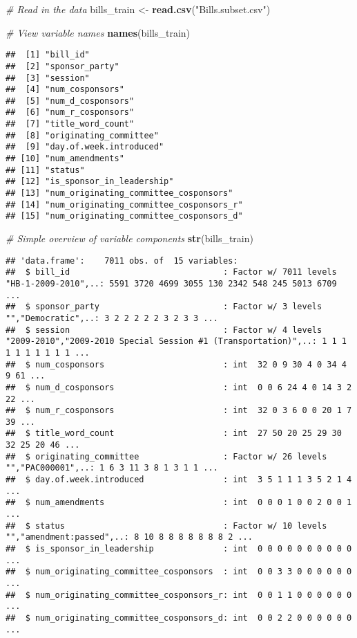 \documentclass[]{article}
\newenvironment{Shaded}{\begin{snugshade}}{\end{snugshade}}
\newcommand{\KeywordTok}[1]{\textcolor[rgb]{0.13,0.29,0.53}{\textbf{#1}}}
\newcommand{\StringTok}[1]{\textcolor[rgb]{0.31,0.60,0.02}{#1}}
\newcommand{\CommentTok}[1]{\textcolor[rgb]{0.56,0.35,0.01}{\textit{#1}}}
\newcommand{\NormalTok}[1]{#1}
\begin{document}
\begin{Shaded}
\begin{Highlighting}[]
\CommentTok{# Read in the data}
\NormalTok{bills_train <-}\StringTok{ }\KeywordTok{read.csv}\NormalTok{(}\StringTok{"Bills.subset.csv"}\NormalTok{)}

\CommentTok{# View variable names}
\KeywordTok{names}\NormalTok{(bills_train)}
\end{Highlighting}
\end{Shaded}

\begin{verbatim}
##  [1] "bill_id"                               
##  [2] "sponsor_party"                         
##  [3] "session"                               
##  [4] "num_cosponsors"                        
##  [5] "num_d_cosponsors"                      
##  [6] "num_r_cosponsors"                      
##  [7] "title_word_count"                      
##  [8] "originating_committee"                 
##  [9] "day.of.week.introduced"                
## [10] "num_amendments"                        
## [11] "status"                                
## [12] "is_sponsor_in_leadership"              
## [13] "num_originating_committee_cosponsors"  
## [14] "num_originating_committee_cosponsors_r"
## [15] "num_originating_committee_cosponsors_d"
\end{verbatim}

\begin{Shaded}
\begin{Highlighting}[]
\CommentTok{# Simple overview of variable components}
\KeywordTok{str}\NormalTok{(bills_train)}
\end{Highlighting}
\end{Shaded}

\begin{verbatim}
## 'data.frame':    7011 obs. of  15 variables:
##  $ bill_id                               : Factor w/ 7011 levels "HB-1-2009-2010",..: 5591 3720 4699 3055 130 2342 548 245 5013 6709 ...
##  $ sponsor_party                         : Factor w/ 3 levels "","Democratic",..: 3 2 2 2 2 2 3 2 3 3 ...
##  $ session                               : Factor w/ 4 levels "2009-2010","2009-2010 Special Session #1 (Transportation)",..: 1 1 1 1 1 1 1 1 1 1 ...
##  $ num_cosponsors                        : int  32 0 9 30 4 0 34 4 9 61 ...
##  $ num_d_cosponsors                      : int  0 0 6 24 4 0 14 3 2 22 ...
##  $ num_r_cosponsors                      : int  32 0 3 6 0 0 20 1 7 39 ...
##  $ title_word_count                      : int  27 50 20 25 29 30 32 25 20 46 ...
##  $ originating_committee                 : Factor w/ 26 levels "","PAC000001",..: 1 6 3 11 3 8 1 3 1 1 ...
##  $ day.of.week.introduced                : int  3 5 1 1 1 3 5 2 1 4 ...
##  $ num_amendments                        : int  0 0 0 1 0 0 2 0 0 1 ...
##  $ status                                : Factor w/ 10 levels "","amendment:passed",..: 8 10 8 8 8 8 8 8 8 2 ...
##  $ is_sponsor_in_leadership              : int  0 0 0 0 0 0 0 0 0 0 ...
##  $ num_originating_committee_cosponsors  : int  0 0 3 3 0 0 0 0 0 0 ...
##  $ num_originating_committee_cosponsors_r: int  0 0 1 1 0 0 0 0 0 0 ...
##  $ num_originating_committee_cosponsors_d: int  0 0 2 2 0 0 0 0 0 0 ...
\end{verbatim}
\end{document}
